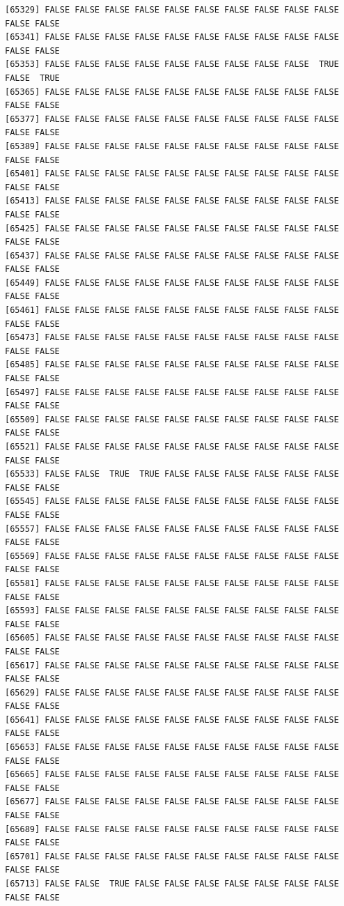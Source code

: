 \documentclass[
  a4paper,
  DIV=11,
  numbers=noendperiod]{scrartcl}
\begin{document}
\begin{verbatim}
[65329] FALSE FALSE FALSE FALSE FALSE FALSE FALSE FALSE FALSE FALSE FALSE FALSE
[65341] FALSE FALSE FALSE FALSE FALSE FALSE FALSE FALSE FALSE FALSE FALSE FALSE
[65353] FALSE FALSE FALSE FALSE FALSE FALSE FALSE FALSE FALSE  TRUE FALSE  TRUE
[65365] FALSE FALSE FALSE FALSE FALSE FALSE FALSE FALSE FALSE FALSE FALSE FALSE
[65377] FALSE FALSE FALSE FALSE FALSE FALSE FALSE FALSE FALSE FALSE FALSE FALSE
[65389] FALSE FALSE FALSE FALSE FALSE FALSE FALSE FALSE FALSE FALSE FALSE FALSE
[65401] FALSE FALSE FALSE FALSE FALSE FALSE FALSE FALSE FALSE FALSE FALSE FALSE
[65413] FALSE FALSE FALSE FALSE FALSE FALSE FALSE FALSE FALSE FALSE FALSE FALSE
[65425] FALSE FALSE FALSE FALSE FALSE FALSE FALSE FALSE FALSE FALSE FALSE FALSE
[65437] FALSE FALSE FALSE FALSE FALSE FALSE FALSE FALSE FALSE FALSE FALSE FALSE
[65449] FALSE FALSE FALSE FALSE FALSE FALSE FALSE FALSE FALSE FALSE FALSE FALSE
[65461] FALSE FALSE FALSE FALSE FALSE FALSE FALSE FALSE FALSE FALSE FALSE FALSE
[65473] FALSE FALSE FALSE FALSE FALSE FALSE FALSE FALSE FALSE FALSE FALSE FALSE
[65485] FALSE FALSE FALSE FALSE FALSE FALSE FALSE FALSE FALSE FALSE FALSE FALSE
[65497] FALSE FALSE FALSE FALSE FALSE FALSE FALSE FALSE FALSE FALSE FALSE FALSE
[65509] FALSE FALSE FALSE FALSE FALSE FALSE FALSE FALSE FALSE FALSE FALSE FALSE
[65521] FALSE FALSE FALSE FALSE FALSE FALSE FALSE FALSE FALSE FALSE FALSE FALSE
[65533] FALSE FALSE  TRUE  TRUE FALSE FALSE FALSE FALSE FALSE FALSE FALSE FALSE
[65545] FALSE FALSE FALSE FALSE FALSE FALSE FALSE FALSE FALSE FALSE FALSE FALSE
[65557] FALSE FALSE FALSE FALSE FALSE FALSE FALSE FALSE FALSE FALSE FALSE FALSE
[65569] FALSE FALSE FALSE FALSE FALSE FALSE FALSE FALSE FALSE FALSE FALSE FALSE
[65581] FALSE FALSE FALSE FALSE FALSE FALSE FALSE FALSE FALSE FALSE FALSE FALSE
[65593] FALSE FALSE FALSE FALSE FALSE FALSE FALSE FALSE FALSE FALSE FALSE FALSE
[65605] FALSE FALSE FALSE FALSE FALSE FALSE FALSE FALSE FALSE FALSE FALSE FALSE
[65617] FALSE FALSE FALSE FALSE FALSE FALSE FALSE FALSE FALSE FALSE FALSE FALSE
[65629] FALSE FALSE FALSE FALSE FALSE FALSE FALSE FALSE FALSE FALSE FALSE FALSE
[65641] FALSE FALSE FALSE FALSE FALSE FALSE FALSE FALSE FALSE FALSE FALSE FALSE
[65653] FALSE FALSE FALSE FALSE FALSE FALSE FALSE FALSE FALSE FALSE FALSE FALSE
[65665] FALSE FALSE FALSE FALSE FALSE FALSE FALSE FALSE FALSE FALSE FALSE FALSE
[65677] FALSE FALSE FALSE FALSE FALSE FALSE FALSE FALSE FALSE FALSE FALSE FALSE
[65689] FALSE FALSE FALSE FALSE FALSE FALSE FALSE FALSE FALSE FALSE FALSE FALSE
[65701] FALSE FALSE FALSE FALSE FALSE FALSE FALSE FALSE FALSE FALSE FALSE FALSE
[65713] FALSE FALSE  TRUE FALSE FALSE FALSE FALSE FALSE FALSE FALSE FALSE FALSE

\end{verbatim}
\end{document}
